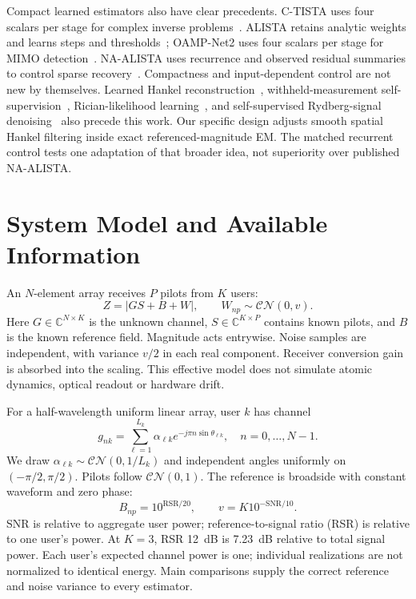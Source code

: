 \documentclass[10pt,journal,letterpaper]{IEEEtran}
\newcommand{\CN}{\mathcal{CN}}
\begin{document}
Compact learned estimators also have clear precedents. C-TISTA uses four scalars per stage for complex inverse problems~\cite{takabe2020ctista}. ALISTA retains analytic weights and learns steps and thresholds~\cite{liu2019alista}; OAMP-Net2 uses four scalars per stage for MIMO detection~\cite{he2020oamp}. NA-ALISTA uses recurrence and observed residual summaries to control sparse recovery~\cite{behrens2021naalista}. Compactness and input-dependent control are not new by themselves. Learned Hankel reconstruction~\cite{huang2021}, withheld-measurement self-supervision~\cite{yaman2020,luo2023}, Rician-likelihood learning~\cite{parker2023}, and self-supervised Rydberg-signal denoising~\cite{liu2026} also precede this work. Our specific design adjusts smooth spatial Hankel filtering inside exact referenced-magnitude EM. The matched recurrent control tests one adaptation of that broader idea, not superiority over published NA-ALISTA.

\section{System Model and Available Information}
An $N$-element array receives $P$ pilots from $K$ users:
\begin{equation}
 Z=|GS+B+W|,\qquad W_{np}\sim\CN(0,v).
 \label{eq:model}
\end{equation}
Here $G\in\mathbb C^{N\times K}$ is the unknown channel, $S\in\mathbb C^{K\times P}$ contains known pilots, and $B$ is the known reference field. Magnitude acts entrywise. Noise samples are independent, with variance $v/2$ in each real component. Receiver conversion gain is absorbed into the scaling. This effective model does not simulate atomic dynamics, optical readout or hardware drift.

For a half-wavelength uniform linear array, user $k$ has channel
\begin{equation}
 g_{nk}=\sum_{\ell=1}^{L_k}\alpha_{\ell k}e^{-j\pi n\sin\theta_{\ell k}},
 \quad n=0,\ldots,N-1.
 \label{eq:channel}
\end{equation}
We draw $\alpha_{\ell k}\sim\CN(0,1/L_k)$ and independent angles uniformly on $(-\pi/2,\pi/2)$. Pilots follow $\CN(0,1)$. The reference is broadside with constant waveform and zero phase:
\begin{equation}
 B_{np}=10^{\mathrm{RSR}/20},\qquad v=K10^{-\mathrm{SNR}/10}.
\end{equation}
SNR is relative to aggregate user power; reference-to-signal ratio (RSR) is relative to one user's power. At $K=3$, RSR 12~dB is 7.23~dB relative to total signal power. Each user's expected channel power is one; individual realizations are not normalized to identical energy. Main comparisons supply the correct reference and noise variance to every estimator.
\end{document}
